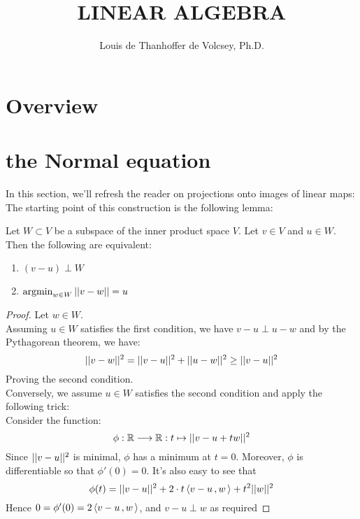 \documentclass{dsp}
\begin{document}
\title{LINEAR ALGEBRA}
\date{}
\author{Louis de Thanhoffer de Volcsey, Ph.D.}
\maketitle	

\noindent\hrulefill
\tableofcontents
\noindent\hrulefill

\section{Overview}
\label{section:overview}

\section{the Normal equation}
\label{section:the_normal_equation}

\noindent In this section, we'll refresh the reader on projections onto images of linear maps: The starting point of this construction is the following lemma:
\begin{lemma}\label{lem:mindist-perp}
	Let $W\subset V$ be a subspace of the inner product space $V$. Let $v \in V$ and $u \in W$.\\
	Then the  following are equivalent:
	\begin{enumerate}
		\item $(v-u) \perp W$
		\item $	\operatorname{argmin}_{w \in W}\vert \vert v-w \vert \vert =u$	
	\end{enumerate}
\end{lemma}

\begin{proof}
	Let $w \in W$.\\
	Assuming $u \in W$ satisfies the first condition, we have $v-u \perp u-w$ and by the Pythagorean theorem, we have:
	\[
	\vert \vert v-w \vert \vert^2 = \vert \vert v-u \vert \vert^2+\vert \vert u-w \vert \vert^2 \ge \vert \vert v-u \vert \vert^2
	\]
	Proving the second condition.\\ 
	Conversely, we assume $u\in W$ satisfies the second condition and apply the following trick:\\
	Consider the function:
	\[
	\phi:\mathbb{R}\longrightarrow \mathbb{R}: t \mapsto \vert \vert v-u+tw \vert \vert^2
	\]	
	Since $\vert \vert v-u \vert \vert^2$ is minimal, $\phi$ has a minimum at $t=0$. Moreover, $\phi$ is differentiable so that $\phi'(0)=0$. It's also easy to see that
	\[
	\phi(t) = \vert \vert v-u \vert \vert^2 +2\cdot t \left\langle v-u\,,w\, \right\rangle+t^2\vert \vert w \vert \vert^2
	\]
	Hence $0=\phi'(0) = 2 \left\langle v-u\,,w\, \right\rangle$, and $v-u\perp w$ as required
\end{proof}
\end{document}
